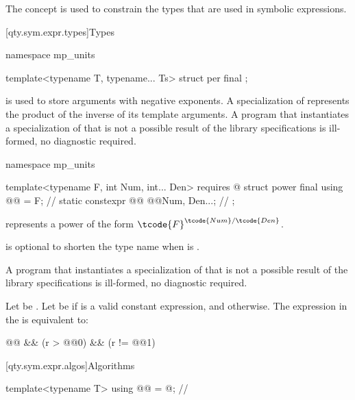 \pnum
The concept 
is used to constrain the types
that are used in symbolic expressions.

[qty.sym.expr.types]{Types}

\begin{codeblock}
namespace mp_units {

template<typename T, typename... Ts>
struct per final {};

}
\end{codeblock}

\pnum
{} is used to store arguments with negative exponents.
A specialization of 
represents the product of the inverse of its template arguments.
A program that instantiates a specialization of 
that is not a possible result of the library specifications
is ill-formed, no diagnostic required.

\begin{codeblock}
namespace mp_units {

template<typename F, int Num, int... Den>
  requires @\seebelownc@
struct power final {
  using @@ = F;                              // \expos
  static constexpr @@ @@{Num, Den...};  // \expos
};

}
\end{codeblock}

\pnum
{} represents a power
of the form $\tcode{F}^{\tcode{Num}/\tcode{Den}}$.
\begin{note}
 is optional to shorten the type name when  is .
\end{note}
A program that instantiates a specialization of 
that is not a possible result of the library specifications
is ill-formed, no diagnostic required.

\pnum
Let  be .
Let  be
 if  is a valid constant expression, and
 otherwise.
The expression in the  is equivalent to:
\begin{codeblock}
@@ && (r > @@{0}) && (r != @@{1})
\end{codeblock}

[qty.sym.expr.algos]{Algorithms}

\begin{codeblock}
template<typename T>
using @@ = @\seebelownc@;  // \expos
\end{codeblock}

